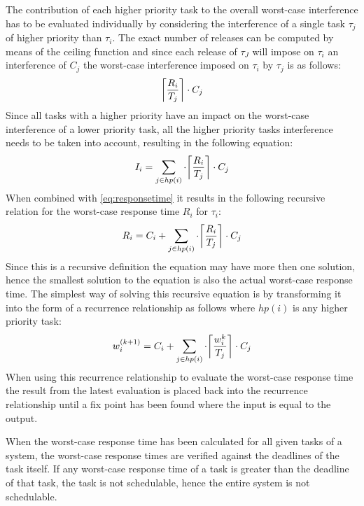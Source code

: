 The contribution of each higher priority task to the overall worst-case interference has to be evaluated individually by considering the interference of a single task $\tau_j$ of higher priority than $\tau_i$.
The exact number of releases can be computed by means of the ceiling function and since each release of $\tau_J$ will impose on $\tau_i$ an interference of $C_j$ the worst-case interference imposed on $\tau_i$ by $\tau_j$ is as follows:
\begin{equation}
\ceil*{\frac{R_i}{T_j}} \cdot C_j
\end{equation}
Since all tasks with a higher priority have an impact on the worst-case interference of a lower priority task, all the higher priority tasks interference needs to be taken into account, resulting in the following equation:
\begin{equation}
I_i = \sum_{j\in hp(i)} \cdot \ceil*{\frac{R_i}{T_j}} \cdot C_j
\end{equation}
When combined with \autoref{eq:responsetime} it results in the following recursive relation for the worst-case response time $R_i$ for $\tau_i$:
\begin{equation}
R_i = C_i + \sum_{j\in hp(i)} \cdot \ceil*{\frac{R_i}{T_j}} \cdot C_j
\end{equation}
Since this is a recursive definition the equation may have more then one solution, hence the smallest solution to the equation is also the actual worst-case response time. 
The simplest way of solving this recursive equation is by transforming it into the form of a recurrence relationship as follows where $hp(i)$ is any higher priority task:
\begin{equation}
w^{(k+1)}_{i} = C_i + \sum_{j\in hp(i)} \cdot \ceil*{\frac{w^{k}_{i}}{T_j}} \cdot C_j
\end{equation}
When using this recurrence relationship to evaluate the worst-case response time the result from the latest evaluation is placed back into the recurrence relationship until a fix point has been found where the input is equal to the output. 

When the worst-case response time has been calculated for all given tasks of a system, the worst-case response times are verified against the deadlines of the task itself.
If any worst-case response time of a task is greater than the deadline of that task, the task is not schedulable, hence the entire system is not schedulable. 
